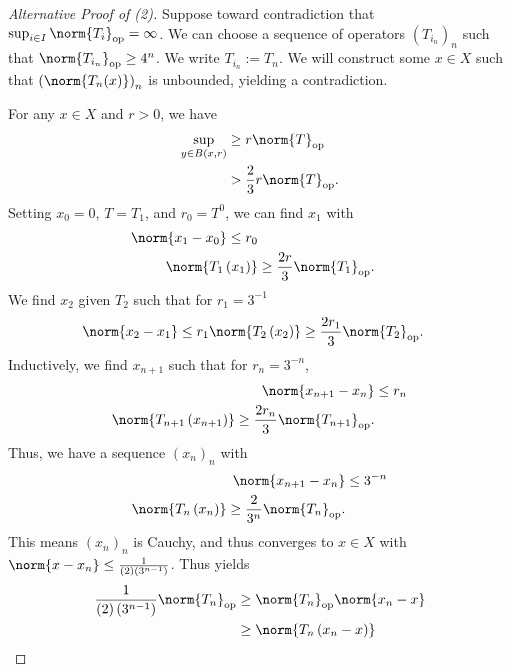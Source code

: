 \documentclass[10pt]{mypackage}
\begin{document}
  \begin{proof}[Alternative Proof of (2)]
    Suppose toward contradiction that $\sup_{i\in I}\norm{T_i}_{\text{op}} = \infty$. We can choose a sequence of operators $\left(T_{i_n}\right)_n$ such that $\norm{T_{i_n}}_{\text{op}}\geq 4^n$. We write $T_{i_n}:=T_n$. We will construct some $x\in X$ such that $\left(\norm{T_n(x)}\right)_n$ is unbounded, yielding a contradiction.\newline

    For any $x\in X$ and $r > 0$, we have
    \begin{align*}
      \sup_{y\in B\left(x,r\right)} &\geq r\norm{T}_{\text{op}}\\
                                    &> \frac{2}{3}r\norm{T}_{\text{op}}.
    \end{align*}
    Setting $x_0 = 0$, $T = T_1$, and $r_0 = T^0$, we can find $x_1$ with
    \begin{align*}
      \norm{x_1 - x_0} \leq r_0\\
      \norm{T_1\left(x_1\right)} &\geq \frac{2r}{3}\norm{T_1}_{\text{op}}.
    \end{align*}
    We find $x_2$ given $T_2$ such that for $r_1 = 3^{-1}$
    \begin{align*}
      \norm{x_2 - x_1} & \leq r_1
      \norm{T_2\left(x_2\right)} \geq \frac{2r_1}{3}\norm{T_2}_{\text{op}}.
    \end{align*}
    Inductively, we find $x_{n+1}$ such that for $r_n = 3^{-n}$,
    \begin{align*}
      \norm{x_{n+1}-x_n} &\leq r_n\\
      \norm{T_{n+1}\left(x_{n+1}\right)} \geq \frac{2r_{n}}{3}\norm{T_{n+1}}_{\text{op}}.
    \end{align*}
    Thus, we have a sequence $\left(x_n\right)_n$ with
    \begin{align*}
      \norm{x_{n+1}-x_n} &\leq 3^{-n}\\
      \norm{T_n\left(x_n\right)}\geq \frac{2}{3^n}\norm{T_n}_{\text{op}}.
    \end{align*}
    This means $\left(x_n\right)_n$ is Cauchy, and thus converges to $x\in X$ with $\norm{x-x_n}\leq \frac{1}{(2)\left(3^{n-1}\right)}$. Thus yields
    \begin{align*}
      \frac{1}{\left(2\right)\left(3^{n-1}\right)}\norm{T_n}_{\text{op}} &\geq \norm{T_n}_{\text{op}}\norm{x_n - x}\\
                                                                     &\geq \norm{T_n\left(x_n -x\right)}\\

\end{align*}
\end{proof}
\end{document}
